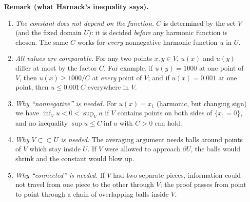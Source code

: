 \documentclass[11pt]{article}
\theoremstyle{plain}
\theoremstyle{definition}
\theoremstyle{remark}
\begin{document}
\textbf{Remark (what Harnack's inequality says).}
\begin{enumerate}
    \item \emph{The constant does not depend on the function.} $C$ is determined by the set $V$ (and the fixed domain $U$): it is decided \emph{before} any harmonic function is chosen. The same $C$ works for \emph{every} nonnegative harmonic function $u$ in $U$.
    \item \emph{All values are comparable.} For any two points $x, y \in V$, $u(x)$ and $u(y)$ differ at most by the factor $C$. For example, if $u(y) = 1000$ at one point of $V$, then $u(x) \geq 1000/C$ at \emph{every} point of $V$; and if $u(x) = 0.001$ at one point, then $u \leq 0.001\, C$ everywhere in $V$.
    \item \emph{Why ``nonnegative'' is needed.} For $u(x) = x_1$ (harmonic, but changing sign) we have $\inf_V u < 0 < \sup_V u$ if $V$ contains points on both sides of $\{x_1 = 0\}$, and no inequality $\sup u \leq C\inf u$ with $C > 0$ can hold.
    \item \emph{Why $V \subset\subset U$ is needed.} The averaging argument needs balls around points of $V$ which stay inside $U$. If $V$ were allowed to approach $\partial U$, the balls would shrink and the constant would blow up.
    \item \emph{Why ``connected'' is needed.} If $V$ had two separate pieces, information could not travel from one piece to the other through $V$; the proof passes from point to point through a chain of overlapping balls inside $V$.
\end{enumerate}
\end{document}
